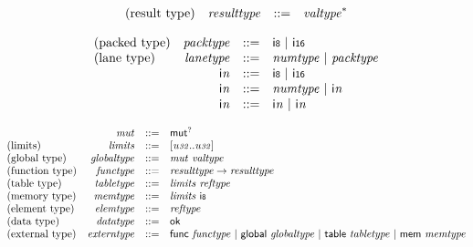 \vspace{1ex}

$$
\begin{array}{@{}lrrl@{}l@{}}
\mbox{(result type)} & {\mathit{resulttype}} &::=& {{\mathit{valtype}}^\ast} \\
\end{array}
$$

\vspace{1ex}

$$
\begin{array}{@{}lrrl@{}l@{}}
\mbox{(packed type)} & {\mathit{packtype}} &::=& \mathsf{i{\scriptstyle8}} ~|~ \mathsf{i{\scriptstyle16}} \\
\mbox{(lane type)} & {\mathit{lanetype}} &::=& {\mathit{numtype}} ~|~ {\mathit{packtype}} \\
& {\mathsf{i}}{{\mathit{n}}} &::=& \mathsf{i{\scriptstyle8}} ~|~ \mathsf{i{\scriptstyle16}} \\
& {\mathsf{i}}{{\mathit{n}}} &::=& {\mathit{numtype}} ~|~ {\mathsf{i}}{{\mathit{n}}} \\
& {\mathsf{i}}{{\mathit{n}}} &::=& {\mathsf{i}}{{\mathit{n}}} ~|~ {\mathsf{i}}{{\mathit{n}}} \\
\end{array}
$$

\vspace{1ex}

$$
\begin{array}{@{}lrrl@{}l@{}}
& {\mathit{mut}} &::=& {\mathsf{mut}^?} \\
\mbox{(limits)} & {\mathit{limits}} &::=& {}[{\mathit{u{\scriptstyle32}}} .. {\mathit{u{\scriptstyle32}}}] \\
\mbox{(global type)} & {\mathit{globaltype}} &::=& {\mathit{mut}}~{\mathit{valtype}} \\
\mbox{(function type)} & {\mathit{functype}} &::=& {\mathit{resulttype}} \rightarrow {\mathit{resulttype}} \\
\mbox{(table type)} & {\mathit{tabletype}} &::=& {\mathit{limits}}~{\mathit{reftype}} \\
\mbox{(memory type)} & {\mathit{memtype}} &::=& {\mathit{limits}}~\mathsf{i{\scriptstyle8}} \\
\mbox{(element type)} & {\mathit{elemtype}} &::=& {\mathit{reftype}} \\
\mbox{(data type)} & {\mathit{datatype}} &::=& \mathsf{ok} \\
\mbox{(external type)} & {\mathit{externtype}} &::=& \mathsf{func}~{\mathit{functype}} ~|~ \mathsf{global}~{\mathit{globaltype}} ~|~ \mathsf{table}~{\mathit{tabletype}} ~|~ \mathsf{mem}~{\mathit{memtype}} \\
\end{array}
$$


